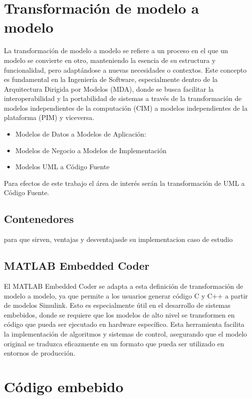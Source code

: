 \section{Transformación de modelo a modelo}

La transformación de modelo a modelo se refiere a un proceso en el que un modelo se convierte en otro, manteniendo la esencia de su estructura y funcionalidad, 
pero adaptándose a nuevas necesidades o contextos. Este concepto es fundamental en la Ingeniería de Software, especialmente dentro de la Arquitectura Dirigida 
por Modelos (MDA), donde se busca facilitar la interoperabilidad y la portabilidad de sistemas a través de la transformación de modelos independientes de la computación 
(CIM) a modelos independientes de la plataforma (PIM) y viceversa.

\begin{itemize}
    \item Modelos de Datos a Modelos de Aplicación:
    \item Modelos de Negocio a Modelos de Implementación
    \item Modelos UML a Código Fuente
\end{itemize}

Para efectos de este trabajo el área de interés serán la transformación de UML a Código Fuente.

\subsection{Contenedores}

para que sirven, ventajas y desventajasde su implementacion caso de estudio

\subsection{MATLAB Embedded Coder}

El MATLAB Embedded Coder se adapta a esta definición de transformación de modelo a modelo, ya que permite a los usuarios generar código C y C++ a partir de modelos 
Simulink. Esto es especialmente útil en el desarrollo de sistemas embebidos, donde se requiere que los modelos de alto nivel se transformen en código 
que pueda ser ejecutado en hardware específico. Esta herramienta facilita la implementación de algoritmos y sistemas de control, asegurando que el modelo original 
se traduzca eficazmente en un formato que pueda ser utilizado en entornos de producción.

\section{Código embebido}

